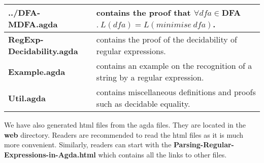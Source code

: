 \begin{center}
\begin{longtable}{| p{5.2cm} | p{8.3cm} |}
\textbf{../DFA-MDFA.agda} & contains the proof that \(\forall
dfa\in\)DFA\(.\ L(dfa) = L(minimise\ dfa)\). \\ \hline
\textbf{RegExp-Decidability.agda} & contains the proof of the
decidability of regular expressions. \\ \hline
\textbf{Example.agda} & contains an example on the recognition of a
string by a regular expression. \\ \hline
\textbf{Util.agda} & contains miscellaneous definitions and proofs
such as decidable equality. \\ \hline
\end{longtable}
\end{center}

\par We have also generated html files from the agda files. They are located in the \textbf{web} directory. Readers are
recommended to read the html files as it is much more
convenient. Similarly, readers can start with the
\textbf{Parsing-Regular-Expressions-in-Agda.html} which contains all
the links to other files. 